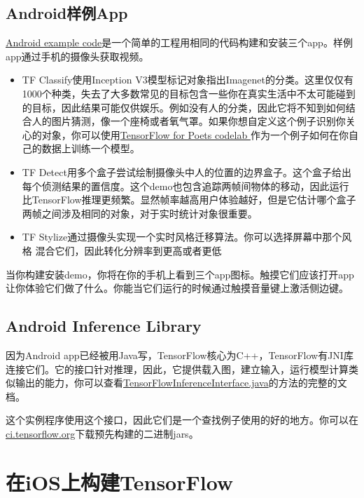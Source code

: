 \subsection{Android样例App}
\href{https://www.github.com/tensorflow/tensorflow/blob/r1.4/tensorflow/examples/android/}{Android example code}是一个简单的工程用相同的代码构建和安装三个app。样例app通过手机的摄像头获取视频。
\begin{itemize}
\item TF Classify使用Inception V3模型标记对象指出Imagenet的分类。这里仅仅有1000个种类，失去了大多数常见的目标包含一些你在真实生活中不太可能碰到的目标，因此结果可能仅供娱乐。例如没有人的分类，因此它将不知到如何结合人的图片猜测，像一个座椅或者氧气罩。如果你想自定义这个例子识别你关心的对象，你可以使用\href{https://codelabs.developers.google.com/codelabs/tensorflow-for-poets/index.html?hl=zh-cn#0}{TensorFlow for Poets codelab }作为一个例子如何在你自己的数据上训练一个模型。
\item TF Detect用多个盒子尝试绘制摄像头中人的位置的边界盒子。这个盒子给出每个侦测结果的置信度。这个demo也包含追踪两帧间物体的移动，因此运行比TensorFlow推理更频繁。显然帧率越高用户体验越好，但是它估计哪个盒子两帧之间涉及相同的对象，对于实时统计对象很重要。
\item TF Stylize通过摄像头实现一个实时风格迁移算法。你可以选择屏幕中那个风格
混合它们，因此转化分辨率到更高或者更低
\end{itemize}
当你构建安装demo，你将在你的手机上看到三个app图标。触摸它们应该打开app让你体验它们做了什么。你能当它们运行的时候通过触摸音量键上激活侧边键。
\subsection{Android Inference Library}
因为Android app已经被用Java写，TensorFlow核心为C++，TensorFlow有JNI库连接它们。它的接口针对推理，因此，它提供载入图，建立输入，运行模型计算类似输出的能力，你可以查看\href{https://www.github.com/tensorflow/tensorflow/blob/r1.4/tensorflow/contrib/android/java/org/tensorflow/contrib/android/TensorFlowInferenceInterface.java}{TensorFlowInferenceInterface.java}的方法的完整的文档。

这个实例程序使用这个接口，因此它们是一个查找例子使用的好的地方。你可以在\href{https://ci.tensorflow.org/view/Nightly/job/nightly-android/?hl=zh-cn}{ci.tensorflow.org}下载预先构建的二进制jars。
\section{在iOS上构建TensorFlow}
